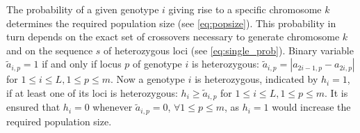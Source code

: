 \documentclass[runningheads]{llncs}
\begin{document}
The probability of a given genotype $i$ giving rise to a specific chromosome $k$ determines the 
required population size (see \eqref{eq:popsize}). This probability in turn depends on the exact set of
crossovers necessary to generate chromosome $k$ and on the sequence $s$ of heterozygous
loci (see \eqref{eq:single_prob}). Binary variable $\tilde{a}_{i,p}=1$ if and only if locus $p$ of genotype $i$ is heterozygous: $\tilde{a}_{i,p} = |a_{2i-1,p} - a_{2i,p}|$ for $1 \leq i \leq L, 1 \leq p \leq m$.
Now a genotype $i$ is heterozygous, indicated by $h_i=1$, if at least one of its loci is heterozygous: $h_i \geq \tilde{a}_{i,p}$ for  $1 \leq i \leq L, 1 \leq p \leq m$.
It is ensured that $h_i=0$ whenever $\tilde{a}_{i,p}=0$, $\forall 1 \leq p \leq m$, as $h_i=1$ would increase the required population size.
\end{document}
